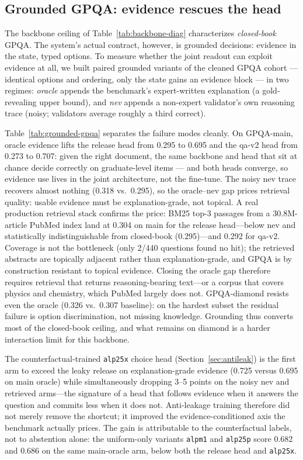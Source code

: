 \documentclass[11pt]{article}
\begin{document}
\subsection{Grounded GPQA: evidence rescues the head}
\label{sec:grounded-gpqa}
The backbone ceiling of Table~\ref{tab:backbone-diag} characterizes
\emph{closed-book} GPQA. The system's actual contract, however, is
grounded decisions: evidence in the state, typed options. To measure
whether the joint readout can exploit evidence at all, we built paired
grounded variants of the cleaned GPQA cohort --- identical options and
ordering, only the state gains an evidence block --- in two regimes:
\emph{oracle} appends the benchmark's expert-written explanation (a
gold-revealing upper bound), and \emph{nev} appends a non-expert
validator's own reasoning trace (noisy; validators average roughly a
third correct).

Table~\ref{tab:grounded-gpqa} separates the failure modes cleanly. On
GPQA-main, oracle evidence lifts the release head from 0.295 to 0.695
and the qa-v2 head from 0.273 to 0.707: given the right document, the
same backbone and head that sit at chance decide correctly on
graduate-level items --- and both heads converge, so evidence use
lives in the joint architecture, not the fine-tune. The noisy nev
trace recovers almost nothing (0.318 vs.\ 0.295), so the oracle--nev
gap prices retrieval quality: usable evidence must be
explanation-grade, not topical. A real production retrieval stack
confirms the price: BM25 top-3 passages from a 30.8M-article PubMed
index land at 0.304 on main for the release head---below nev and
statistically indistinguishable from closed-book (0.295)---and 0.292
for qa-v2. Coverage is not the bottleneck (only 2/440 questions found
no hit); the retrieved abstracts are topically adjacent rather than
explanation-grade, and GPQA is by construction resistant to
topical evidence. Closing the oracle gap therefore requires
retrieval that returns reasoning-bearing text---or a corpus that
covers physics and chemistry, which PubMed largely does not.
GPQA-diamond resists even the oracle
(0.326 vs.\ 0.307 baseline): on the hardest subset the residual
failure is option discrimination, not missing knowledge. Grounding
thus converts most of the closed-book ceiling, and what remains on
diamond is a harder interaction limit for this backbone.

The counterfactual-trained \texttt{alp25x} choice head
(Section~\ref{sec:antileak}) is the first arm to exceed the leaky
release on explanation-grade evidence (0.725 versus 0.695 on main
oracle) while simultaneously dropping 3--5 points on the noisy nev
and retrieved arms---the signature of a head that follows evidence
when it answers the question and commits less when it does not.
Anti-leakage training therefore did not merely remove the shortcut;
it improved the evidence-conditioned axis the benchmark actually
prices. The gain is attributable to the counterfactual labels, not
to abstention alone: the uniform-only variants \texttt{alpm1} and
\texttt{alp25p} score 0.682 and 0.686 on the same main-oracle arm,
below both the release head and \texttt{alp25x}.
\end{document}
